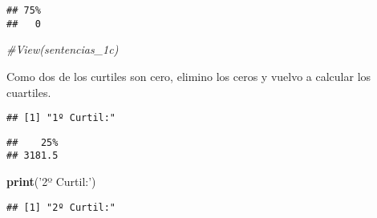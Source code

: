 \documentclass[runningheads,a4paper]{llncs}
\newenvironment{Shaded}{}{}
\newcommand{\KeywordTok}[1]{\textcolor[rgb]{0.00,0.44,0.13}{\textbf{{#1}}}}
\newcommand{\DecValTok}[1]{\textcolor[rgb]{0.25,0.63,0.44}{{#1}}}
\newcommand{\StringTok}[1]{\textcolor[rgb]{0.25,0.44,0.63}{{#1}}}
\newcommand{\CommentTok}[1]{\textcolor[rgb]{0.38,0.63,0.69}{\textit{{#1}}}}
\newcommand{\NormalTok}[1]{{#1}}
\newcommand{\OperatorTok}[1]{\textcolor[rgb]{0.40,0.40,0.40}{{#1}}}
\begin{document}
\begin{verbatim}
## 75% 
##   0
\end{verbatim}

\begin{Shaded}
\begin{Highlighting}[]
\CommentTok{#View(sentencias_1c)}
\end{Highlighting}
\end{Shaded}

Como dos de los curtiles son cero, elimino los ceros y vuelvo a calcular
los cuartiles.

\begin{Shaded}
\end{Shaded}

\begin{verbatim}
## [1] "1º Curtil:"
\end{verbatim}

\begin{Shaded}
\end{Shaded}

\begin{verbatim}
##    25% 
## 3181.5
\end{verbatim}

\begin{Shaded}
\begin{Highlighting}[]
\KeywordTok{print}\NormalTok{(}\StringTok{'2º Curtil:'}\NormalTok{)}
\end{Highlighting}
\end{Shaded}

\begin{verbatim}
## [1] "2º Curtil:"
\end{verbatim}

\begin{Shaded}
\end{Shaded}
\end{document}
